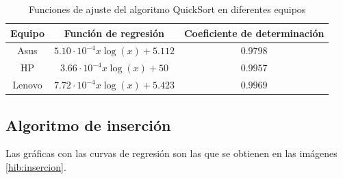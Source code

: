 \documentclass{homework}
\begin{document}
    \begin{table}[H]
        \centering
        \begin{tabular}{|c|c|c|}
            \hline
            Equipo & Función de regresión & Coeficiente de determinación \\
            \hline
            Asus & $5.10 \cdot 10^{-4} x \log(x) + 5.112$ & $0.9798$ \\
            HP & $3.66 \cdot 10^{-4} x \log(x) + 50$ & $0.9957$ \\
            Lenovo & $7.72 \cdot 10^{-4} x \log(x) + 5.423$ & $0.9969$ \\
            \hline
        \end{tabular}
        \caption{Funciones de ajuste del algoritmo QuickSort en diferentes equipos}
    \end{table}

    \subsection{Algoritmo de inserción}

    Las gráficas con las curvas de regresión son las que se obtienen en las imágenes \ref{hib:insercion}.
\end{document}
